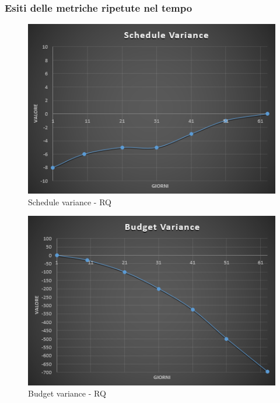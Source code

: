 \subsubsection{Esiti delle metriche ripetute nel tempo}

\begin{figure}[H]
	\centering 
	\includegraphics[scale=0.6]{Sezioni/Immagini/ScheduleVariance-RQ}
	\caption{Schedule variance - RQ}
\end{figure}

\begin{figure}[H]
	\centering 
	\includegraphics[scale=0.6]{Sezioni/Immagini/BudgetVariance-RQ}
	\caption{Budget variance - RQ}
\end{figure}

